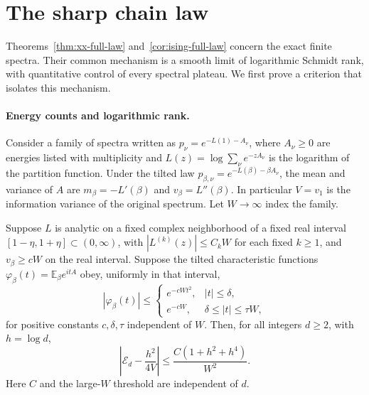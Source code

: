\section{The sharp chain law}\label{sec:law}

Theorems~\ref{thm:xx-full-law} and~\ref{cor:ising-full-law} concern the exact finite spectra. Their common mechanism is a smooth limit of logarithmic Schmidt rank, with quantitative control of every spectral plateau. We first prove a criterion that isolates this mechanism.

\paragraph{Energy counts and logarithmic rank.}
Consider a family of spectra written as $p_\nu=e^{-L(1)-A_\nu}$,
where $A_\nu\ge0$ are energies listed with multiplicity and
$L(z)=\log\sum_\nu e^{-z A_\nu}$ is the logarithm of the partition
function. Under the tilted law $p_{\beta,\nu}=e^{-L(\beta)-\beta A_\nu}$,
the mean and variance of $A$ are $m_\beta=-L'(\beta)$ and
$v_\beta=L''(\beta)$. In particular $V=v_1$ is the information
variance of the original spectrum. Let $W\to\infty$ index the family.

\begin{proposition}
\label{prop:xx-count-to-error}
Suppose $L$ is analytic on a fixed complex neighborhood of a fixed
real interval $[1-\eta,1+\eta]\subset(0,\infty)$, with
$|L^{(k)}(z)|\le C_k W$ for each fixed $k\ge1$, and $v_\beta\ge cW$
on the real interval. Suppose the tilted characteristic functions
$\varphi_\beta(t)=\mathbb E_\beta e^{itA}$ obey, uniformly in that interval,
\begin{equation}\label{eq:chain-damping}
 |\varphi_\beta(t)|\le
 \begin{cases}
 e^{-cWt^2}, & |t|\le\delta,\\
 e^{-cW}, & \delta\le |t|\le\tau W,
 \end{cases}
\end{equation}
for positive constants $c,\delta,\tau$ independent of $W$. Then, for all
integers $d\ge2$, with $h=\log d$,
\begin{equation}\label{eq:xx-error-capacity}
 \left|\mathcal E_d-\frac{h^2}{4V}\right|
 \le\frac{C(1+h^2+h^4)}{W^2}.
\end{equation}
Here $C$ and the large-$W$ threshold are independent of $d$.
\end{proposition}

